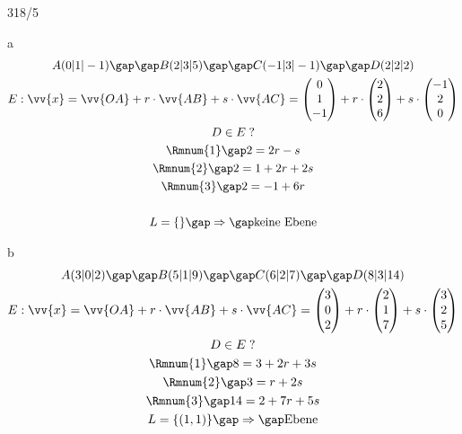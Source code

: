 \begin{exercise}{318/5}
  \item [a]
  \begin{gather*}
    A(0|1|-1) \gap\gap B(2|3|5) \gap\gap C(-1|3|-1) \gap\gap D(2|2|2) \\
    E: \vv{x} = \vv{OA} + r \cdot \vv{AB} + s \cdot \vv{AC} = \begin{pmatrix}0 \\ 1 \\ -1\end{pmatrix} + r \cdot \begin{pmatrix}2 \\ 2 \\ 6\end{pmatrix} + s \cdot \begin{pmatrix}-1 \\ 2 \\ 0\end{pmatrix} \\
    D \in E \; ? \\
    \text{\Rmnum{1}} \gap 2 = 2r - s \\
    \text{\Rmnum{2}} \gap 2 = 1 + 2r + 2s \\
    \text{\Rmnum{3}} \gap 2 = -1 + 6r \\\\
    L = \{\} \gap\Rightarrow\gap \text{keine Ebene}
  \end{gather*}
  \item [b]
  \begin{gather*}
    A(3|0|2) \gap\gap B(5|1|9) \gap\gap C(6|2|7) \gap\gap D(8|3|14) \\
    E: \vv{x} = \vv{OA} + r \cdot \vv{AB} + s \cdot \vv{AC} = \begin{pmatrix}3 \\ 0 \\ 2\end{pmatrix} + r \cdot \begin{pmatrix}2 \\ 1 \\ 7\end{pmatrix} + s \cdot \begin{pmatrix}3 \\ 2 \\ 5\end{pmatrix} \\
    D \in E \; ? \\
    \text{\Rmnum{1}} \gap 8 = 3 + 2r + 3s \\
    \text{\Rmnum{2}} \gap 3 = r + 2s \\
    \text{\Rmnum{3}} \gap 14 = 2 + 7r + 5s \\
    L = \{(1, 1)\} \gap\Rightarrow\gap \text{Ebene}
  \end{gather*}
\end{exercise}
